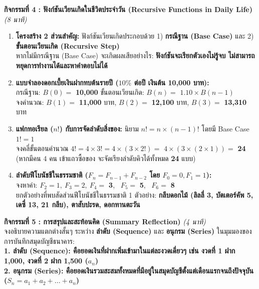 \documentclass[a4paper,12pt]{article}
\newcommand{\ans}[1]{\textbf{\color{ans}#1}}
\begin{document}
\noindent\textbf{กิจกรรมที่ 4 : ฟังก์ชันเวียนเกิดในชีวิตประจำวัน (Recursive Functions in Daily Life)} \hfill \textit{(8 นาที)}
\begin{enumerate}[label=\arabic*)]
  \item \textbf{โครงสร้าง 2 ส่วนสำคัญ:} ฟังก์ชันเวียนเกิดประกอบด้วย 1) \ans{กรณีฐาน (Base Case)} และ 2) \ans{ขั้นตอนเวียนเกิด (Recursive Step)}\\
        หากไม่มีกรณีฐาน (Base Case) จะเกิดผลเสียอย่างไร: \ans{ฟังก์ชันจะเรียกตัวเองไม่รู้จบ ไม่สามารถหยุดการทำงานได้และหาคำตอบไม่ได้}
  \item \textbf{แบบจำลองดอกเบี้ยเงินฝากทบต้นรายปี ($10\%$ ต่อปี เงินต้น 10,000 บาท):}\\
        กรณีฐาน: $B(0) =$ \ans{10,000} \qquad ขั้นตอนเวียนเกิด: $B(n) =$ \ans{$1.10 \times B(n - 1)$}\\
        จงคำนวณ: $B(1) =$ \ans{11,000} บาท, \quad $B(2) =$ \ans{12,100} บาท, \quad $B(3) =$ \ans{13,310} บาท
  \item \textbf{แฟกทอเรียล ($n!$) กับการจัดลำดับสิ่งของ:} นิยาม $n! = n \times (n-1)!$ โดยมี Base Case $1! = 1$\\
        จงคลี่ขั้นตอนคำนวณ $4! = 4 \times 3! = 4 \times (3 \times 2!) = $ \ans{$4 \times (3 \times (2 \times 1)) =$} \ans{24}\\
        (หากมีคน 4 คน เข้าแถวซื้อของ จะจัดเรียงลำดับคิวได้ทั้งหมด \ans{24} แบบ)
  \item \textbf{ลำดับฟีโบนัชชีในธรรมชาติ ($F_n = F_{n-1} + F_{n-2}$ โดย $F_0 = 0, F_1 = 1$):}\\
        จงหาค่า: $F_2 = 1, \ F_3 = 2, \ F_4 = $ \ans{3}, \ $F_5 = $ \ans{5}, \ $F_6 = $ \ans{8}\\
        ยกตัวอย่างที่พบสัดส่วนฟีโบนัชชีในธรรมชาติ 1 ตัวอย่าง: \ans{กลีบดอกไม้ (ลิลลี่ 3, บัตเตอร์คัพ 5, เดซี่ 13, 21 กลีบ), ตาสับปะรด, ดอกทานตะวัน}
\end{enumerate}
\vspace{0.2em}

\noindent\textbf{กิจกรรมที่ 5 : การสรุปและสะท้อนคิด (Summary Reflection)} \hfill \textit{(4 นาที)}\\
จงอธิบายความแตกต่างสั้นๆ ระหว่าง \textbf{ลำดับ (Sequence)} และ \textbf{อนุกรม (Series)} ในมุมมองของการบันทึกสมุดบัญชีธนาคาร:\\[0.15em]
\ans{1. ลำดับ (Sequence): คือยอดเงินที่ฝากเพิ่มเข้ามาในแต่ละงวดเดี่ยวๆ เช่น งวดที่ 1 ฝาก 1,000, งวดที่ 2 ฝาก 1,500 ($a_n$)}\\
\ans{2. อนุกรม (Series): คือยอดเงินรวมสะสมทั้งหมดที่มีอยู่ในสมุดบัญชีตั้งแต่เดือนแรกจนถึงปัจจุบัน ($S_n = a_1 + a_2 + \dots + a_n$)}
\end{document}

